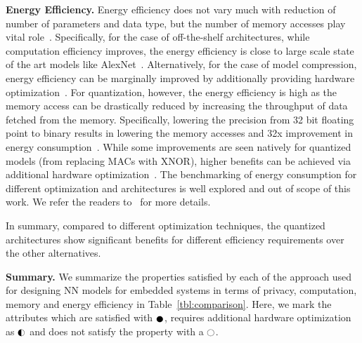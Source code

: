\noindent\textbf{Energy Efficiency.} Energy efficiency does not vary much with reduction of number of parameters and data type, but the number of memory accesses play vital role~\cite{6757323}.
Specifically, for the case of off-the-shelf architectures, while computation efficiency improves, the energy efficiency is close to large scale state of the art models like AlexNet~\cite{DBLP:journals/corr/IandolaMAHDK16,8114708}.
Alternatively, for the case of model compression, energy efficiency can be marginally improved by additionally providing hardware optimization~\cite{journals/corr/YangCS16a,DBLP:journals/corr/HanMD15}.
For quantization, however, the energy efficiency is high as the memory access can be drastically reduced by increasing the throughput of data fetched from the memory.
Specifically, lowering the precision from 32 bit floating point to binary results in lowering the memory accesses and 32x improvement in energy consumption~\cite{NIPS2016_6573,rastegari2016xnornet}.
While some improvements are seen natively for quantized models (from replacing MACs with XNOR), higher benefits can be achieved via additional hardware optimization~\cite{Umuroglu2017FINNAF}.
The benchmarking of energy consumption for different optimization and architectures is well explored and out of scope of this work. We refer the readers to~\cite{8114708} for more details. %

In summary, compared to different optimization techniques, the quantized architectures show significant benefits for different efficiency requirements over the other alternatives.

\noindent\textbf{Summary.}
We summarize the properties satisfied by each of the approach used for designing NN models for embedded systems in terms of privacy, computation, memory and energy efficiency in Table~\ref{tbl:comparison}.
Here, we mark the attributes which are satisfied with $\cmark$, requires additional hardware optimization as $\smark$ and does not satisfy the property with a $\xmark$.

